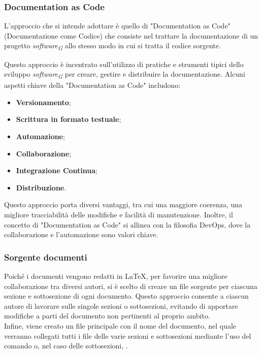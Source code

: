 \subsubsection{Documentation as Code}\label{sec:DocumentationAscode}
L'approccio che si intende adottare è quello di "Documentation as Code" (Documentazione come Codice) che consiste nel trattare la documentazione di un progetto \textit{software}\textsubscript{\textit{G}} allo stesso modo in cui si tratta il codice sorgente.

Questo approccio è incentrato sull'utilizzo di pratiche e strumenti tipici dello sviluppo \textit{software}\textsubscript{\textit{G}} per creare, gestire e distribuire la documentazione.
Alcuni aspetti chiave della "Documentation as Code" includono:
\begin{itemize}
    \item \textbf{Versionamento};
    \item \textbf{Scrittura in formato testuale};
    \item \textbf{Automazione};
    \item \textbf{Collaborazione};
    \item \textbf{Integrazione Continua};
    \item \textbf{Distribuzione}.
\end{itemize}
Questo approccio porta diversi vantaggi, tra cui una maggiore coerenza, una migliore tracciabilità delle modifiche e facilità di manutenzione. Inoltre, il concetto di "Documentation as Code" si allinea con la filosofia DevOps, dove la collaborazione e l'automazione sono valori chiave.\\

\subsubsection{Sorgente documenti}
Poiché i documenti vengono redatti in \LaTeX, per favorire una migliore collaborazione tra diversi autori, si è scelto di creare un file sorgente per ciascuna sezione e sottosezione di ogni documento. Questo approccio consente a ciascun autore di lavorare sulle singole sezioni o sottosezioni, evitando di apportare modifiche a parti del documento non pertinenti al proprio ambito. \\
Infine, viene creato un file principale con il nome del documento, nel quale verranno collegati tutti i file delle varie sezioni e sottosezioni mediante l'uso del comando \verb|| o, nel caso delle sottosezioni, \verb||.


